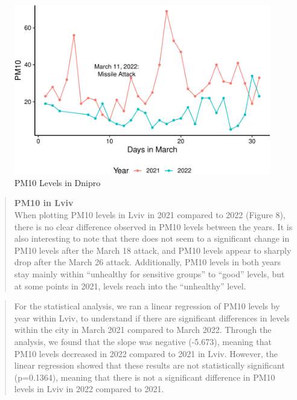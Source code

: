\documentclass[
  12pt,
]{article}
\begin{document}
\begin{figure}
\centering
\includegraphics{Fontanie_Gordon_Weinberg_Project_files/figure-latex/visualizing PM10 in Dnipro-1.pdf}
\caption{PM10 Levels in Dnipro}
\end{figure}

\newpage

\begin{quote}
\textbf{PM10 in Lviv}\\
When plotting PM10 levels in Lviv in 2021 compared to 2022 (Figure 8),
there is no clear difference observed in PM10 levels between the years.
It is also interesting to note that there does not seem to a significant
change in PM10 levels after the March 18 attack, and PM10 levels appear
to sharply drop after the March 26 attack. Additionally, PM10 levels in
both years stay mainly within ``unhealthy for sensitive groups'' to
``good'' levels, but at some points in 2021, levels reach into the
``unhealthy'' level.
\end{quote}

\begin{quote}
For the statistical analysis, we ran a linear regression of PM10 levels
by year within Lviv, to understand if there are significant differences
in levels within the city in March 2021 compared to March 2022. Through
the analysis, we found that the slope was negative (-5.673), meaning
that PM10 levels decreased in 2022 compared to 2021 in Lviv. However,
the linear regression showed that these results are not statistically
significant (p=0.1364), meaning that there is not a significant
difference in PM10 levels in Lviv in 2022 compared to 2021.
\end{quote}
\end{document}
